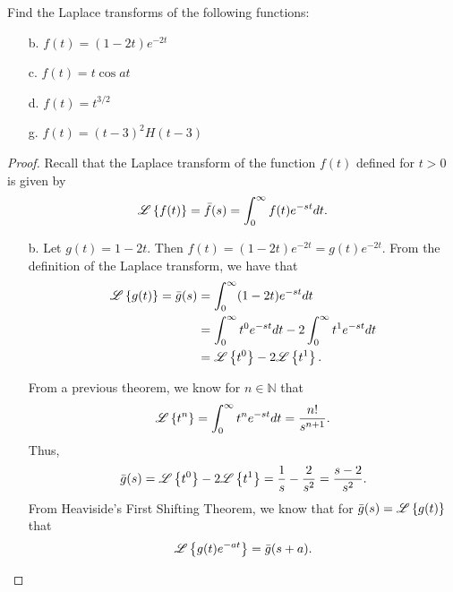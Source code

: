 \begin{problem}{3.1}
  Find the Laplace transforms of the following functions:
  \begin{enumerate}
    \item[b.] $f(t) = (1-2t)e^{-2t}$
    \item[c.] $f(t) = t\cos at$
    \item[d.] $f(t) = t^{3/2}$
    \item[g.] $f(t) = (t-3)^2 H(t-3)$
  \end{enumerate}
\end{problem}

\begin{proof}
  Recall that the Laplace transform of the function $f(t)$ defined for $t>0$ is
  given by
  \begin{align}\label{laplace}
    \mathscr{L}\left\{ {f(t)} \right\} = \bar{f}(s) = \int_0^\infty f(t) e^{-st} dt.
  \end{align}

  \begin{enumerate}
    \item[b.] Let $g(t)=1-2t$. Then $f(t) = (1-2t)e^{-2t} = g(t)e^{-2t}.$
      From the definition of the Laplace transform, we have that
      \begin{align*}
        \mathscr{L}\left\{ {g(t)} \right\} = \bar{g}(s) &= \int_0^\infty (1-2t)e^{-st} dt \\
        &= \int_0^\infty t^0 e^{-st} dt - 2\int_0^\infty t^1 e^{-st} dt \\
        &= \mathscr{L}\left\{ {t^0} \right\} - 2\mathscr{L}\left\{ {t^1} \right\}.
      \end{align*}

      From a previous theorem, we know for $n\in\mathbb{N}$ that
      \begin{align*}
        \mathscr{L}\left\{ {t^n} \right\} = \int_0^\infty t^n e^{-st} dt = \frac{n!}{s^{n+1}}.
      \end{align*}
      Thus,
      \begin{align*}
        \bar{g}(s) = \mathscr{L}\left\{ {t^0} \right\} - 2\mathscr{L}\left\{ {t^1} \right\}
        =\frac{1}{s} -\frac{2}{s^2}
        = \frac{s-2}{s^2}.
      \end{align*}
      From Heaviside's First Shifting Theorem, we know that for $\bar{g}(s) = \mathscr{L}\left\{ {g(t)} \right\}$
      that
      \begin{align*}
        \mathscr{L}\left\{ {g(t)e^{-at}} \right\} = \bar{g}(s+a).
      \end{align*}


\end{enumerate}
\end{proof}

